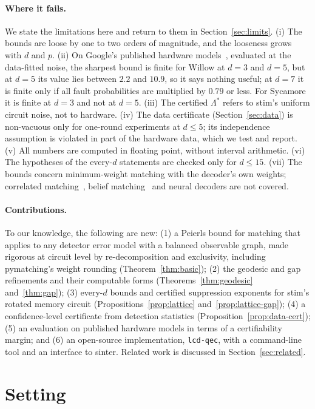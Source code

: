 \documentclass[11pt]{article}
\theoremstyle{plain}
\theoremstyle{definition}
\theoremstyle{remark}
\newcommand{\tsc}[1]{\texttt{#1}}
\renewcommand{\_}{\oldunderscore\allowbreak}
\begin{document}
\paragraph{Where it fails.}
We state the limitations here and return to them in Section~\ref{sec:limits}. (i) The bounds are loose by one to two orders of magnitude, and the looseness grows with $d$ and $p$. (ii) On Google's published hardware models~\cite{Google22,Google24}, evaluated at the data-fitted noise, the sharpest bound is finite for Willow at $d=3$ and $d=5$, but at $d=5$ its value lies between $2.2$ and $10.9$, so it says nothing useful; at $d=7$ it is finite only if all fault probabilities are multiplied by $0.79$ or less. For Sycamore it is finite at $d=3$ and not at $d=5$. (iii) The certified $\Lambda^\ast$ refers to stim's uniform circuit noise, not to hardware. (iv) The data certificate (Section~\ref{sec:data}) is non-vacuous only for one-round experiments at $d\le5$; its independence assumption is violated in part of the hardware data, which we test and report. (v) All numbers are computed in floating point, without interval arithmetic. (vi) The hypotheses of the every-$d$ statements are checked only for $d\le15$. (vii) The bounds concern minimum-weight matching with the decoder's own weights; correlated matching~\cite{FowlerCorr}, belief matching~\cite{BeliefMatching} and neural decoders are not covered.

\paragraph{Contributions.}
To our knowledge, the following are new: (1) a Peierls bound for matching that applies to any detector error model with a balanced observable graph, made rigorous at circuit level by re-decomposition and exclusivity, including pymatching's weight rounding (Theorem~\ref{thm:basic}); (2) the geodesic and gap refinements and their computable forms (Theorems~\ref{thm:geodesic} and~\ref{thm:gap}); (3) every-$d$ bounds and certified suppression exponents for stim's rotated memory circuit (Propositions~\ref{prop:lattice} and~\ref{prop:lattice-gap}); (4) a confidence-level certificate from detection statistics (Proposition~\ref{prop:data-cert}); (5) an evaluation on published hardware models in terms of a certifiability margin; and (6) an open-source implementation, \tsc{lcd-qec}, with a command-line tool and an interface to sinter. Related work is discussed in Section~\ref{sec:related}.

\section{Setting}\label{sec:setting}
\end{document}
